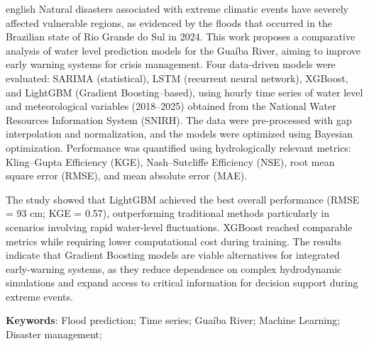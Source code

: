 \documentclass[
	12pt,				%
	openright,			%
	twoside,			%
	a4paper,			%
	english,			%
	french,				%
	spanish,			%
  japanese,
	brazil				%
	]{abntex2}
\newcommand{\listofquadrosname}{Lista de quadros}
\begin{document}
\begin{resumo}[Abstract]
\begin{otherlanguage*}{english}
Natural disasters associated with extreme climatic events have severely affected vulnerable regions, as evidenced by the
floods that occurred in the Brazilian state of Rio Grande do Sul in 2024. This work proposes a comparative analysis of
water level prediction models for the Guaíba River, aiming to improve early warning systems for crisis management. Four
data-driven models were evaluated: SARIMA (statistical), LSTM (recurrent neural network), XGBoost, and LightGBM
(Gradient Boosting–based), using hourly time series of water level and meteorological variables (2018--2025) obtained
from the National Water Resources Information System (SNIRH). The data were pre-processed with gap interpolation and
normalization, and the models were optimized using Bayesian optimization. Performance was quantified using
hydrologically relevant metrics: Kling--Gupta Efficiency (KGE), Nash--Sutcliffe Efficiency (NSE), root mean square error
(RMSE), and mean absolute error (MAE).

The study showed that LightGBM achieved the best overall performance (RMSE = 93 cm; KGE = 0.57), outperforming
traditional methods particularly in scenarios involving rapid water-level fluctuations. XGBoost reached comparable
metrics while requiring lower computational cost during training. The results indicate that Gradient Boosting models are
viable alternatives for integrated early-warning systems, as they reduce dependence on complex hydrodynamic simulations
and expand access to critical information for decision support during extreme events.

   \vspace{\onelineskip}
 
   \noindent 
   \textbf{Keywords}: Flood prediction; Time series; Guaíba River; Machine Learning; Disaster management;
 \end{otherlanguage*}
\end{resumo}



\end{document}

